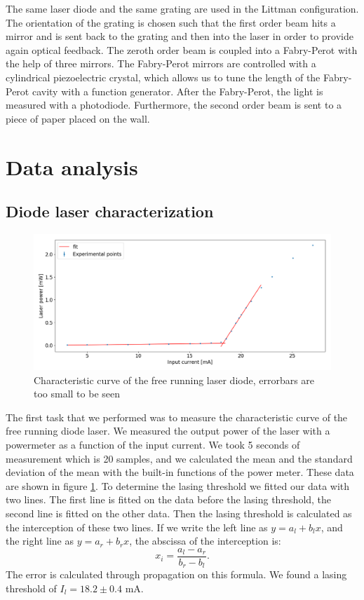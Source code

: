\documentclass[a4paper,10pt]{article}
\begin{document}
The same laser diode and the same grating are used in the Littman configuration. The orientation of the grating is chosen such that the first order beam hits a mirror and is sent back to the grating and then into the laser in order to provide again optical feedback. The zeroth order beam is coupled into a Fabry-Perot with the help of three mirrors. The Fabry-Perot mirrors are controlled with a cylindrical piezoelectric crystal, which allows us to tune the length of the Fabry-Perot cavity with a function generator. After the Fabry-Perot, the light is  measured with a photodiode. Furthermore, the second order beam is sent to a piece of paper placed on the wall.

\section{Data analysis}
\subsection{Diode laser characterization}
\begin{figure}[H]
\centering
\includegraphics[width=\textwidth]{curvefreerunning.png}
\caption{Characteristic curve of the free running laser diode, errorbars are too small to be seen}\label{curvefreerunning}
\end{figure}
The first task that we performed was to measure the characteristic curve of the free running diode laser. We measured the output power of the laser with a powermeter as a function of the input current. We took 5 seconds of measurement which is 20 samples, and we calculated the mean and the standard deviation of the mean with the built-in functions of the power meter. These data are shown in figure \ref{curvefreerunning}. To determine the lasing threshold we fitted our data with two lines. The first line is fitted on the data before the lasing threshold, the second line is fitted on the other data. Then the lasing threshold is calculated as the interception of these two lines. If we write the left line as $y=a_l + b_lx$, and the right line as $y = a_r +b_r x$, the abscissa of the interception is:
\begin{equation}x_i = \frac{a_l-a_r}{b_r-b_l}.\end{equation}
The error is calculated through propagation on this formula. We found a lasing threshold of $I_l = 18.2\pm 0.4$ mA.
\end{document}
